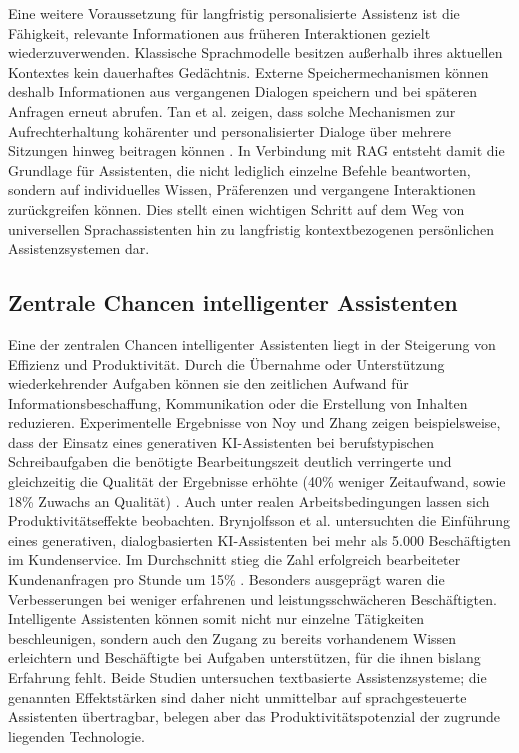 Eine weitere Voraussetzung für langfristig personalisierte Assistenz ist die Fähigkeit, relevante Informationen aus früheren Interaktionen gezielt wiederzuverwenden. Klassische Sprachmodelle besitzen außerhalb ihres aktuellen Kontextes kein dauerhaftes Gedächtnis. Externe Speichermechanismen können deshalb Informationen aus vergangenen Dialogen speichern und bei späteren Anfragen erneut abrufen. Tan et al. zeigen, dass solche Mechanismen zur Aufrechterhaltung kohärenter und personalisierter Dialoge über mehrere Sitzungen hinweg beitragen können \cite{tan2025prospect}. In Verbindung mit RAG entsteht damit die Grundlage für Assistenten, die nicht lediglich einzelne Befehle beantworten, sondern auf individuelles Wissen, Präferenzen und vergangene Interaktionen zurückgreifen können. Dies stellt einen wichtigen Schritt auf dem Weg von universellen Sprachassistenten hin zu langfristig kontextbezogenen persönlichen Assistenzsystemen dar.

\subsection{Zentrale Chancen intelligenter Assistenten}

Eine der zentralen Chancen intelligenter Assistenten liegt in der Steigerung von Effizienz und Produktivität. Durch die Übernahme oder Unterstützung wiederkehrender Aufgaben können sie den zeitlichen Aufwand für Informationsbeschaffung, Kommunikation oder die Erstellung von Inhalten reduzieren. Experimentelle Ergebnisse von Noy und Zhang zeigen beispielsweise, dass der Einsatz eines generativen KI-Assistenten bei berufstypischen Schreibaufgaben die benötigte Bearbeitungszeit deutlich verringerte und gleichzeitig die Qualität der Ergebnisse erhöhte (40\% weniger Zeitaufwand, sowie 18\% Zuwachs an Qualität) \cite{noy2023experimental}. Auch unter realen Arbeitsbedingungen lassen sich Produktivitätseffekte beobachten. Brynjolfsson et al. untersuchten die Einführung eines generativen, dialogbasierten KI-Assistenten bei mehr als 5.000 Beschäftigten im Kundenservice. Im Durchschnitt stieg die Zahl erfolgreich bearbeiteter Kundenanfragen pro Stunde um 15\% \cite{brynjolfsson2025generative}. Besonders ausgeprägt waren die Verbesserungen bei weniger erfahrenen und leistungsschwächeren Beschäftigten. Intelligente Assistenten können somit nicht nur einzelne Tätigkeiten beschleunigen, sondern auch den Zugang zu bereits vorhandenem Wissen erleichtern und Beschäftigte bei Aufgaben unterstützen, für die ihnen bislang Erfahrung fehlt. Beide Studien untersuchen textbasierte Assistenzsysteme; die genannten Effektstärken sind daher nicht unmittelbar auf sprachgesteuerte Assistenten übertragbar, belegen aber das Produktivitätspotenzial der zugrunde liegenden Technologie.

